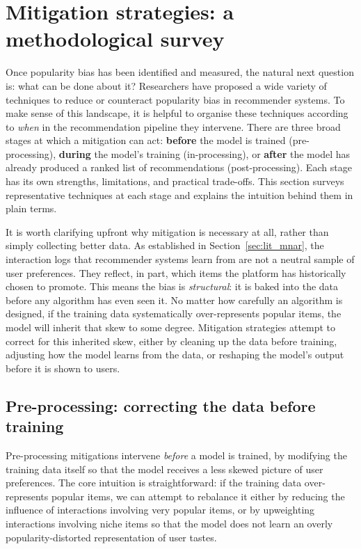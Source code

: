 \documentclass[11pt,a4paper]{report}
\begin{document}
\section{Mitigation strategies: a methodological survey}
\label{sec:lit_mitigation}

Once popularity bias has been identified and measured, the natural next question is: what can be done about it? Researchers have proposed a wide variety of techniques to reduce or counteract popularity bias in recommender systems. To make sense of this landscape, it is helpful to organise these techniques according to \emph{when} in the recommendation pipeline they intervene. There are three broad stages at which a mitigation can act: \textbf{before} the model is trained (pre-processing), \textbf{during} the model's training (in-processing), or \textbf{after} the model has already produced a ranked list of recommendations (post-processing). Each stage has its own strengths, limitations, and practical trade-offs. This section surveys representative techniques at each stage and explains the intuition behind them in plain terms.

It is worth clarifying upfront why mitigation is necessary at all, rather than simply collecting better data. As established in Section~\ref{sec:lit_mnar}, the interaction logs that recommender systems learn from are not a neutral sample of user preferences. They reflect, in part, which items the platform has historically chosen to promote. This means the bias is \emph{structural}: it is baked into the data before any algorithm has even seen it. No matter how carefully an algorithm is designed, if the training data systematically over-represents popular items, the model will inherit that skew to some degree. Mitigation strategies attempt to correct for this inherited skew, either by cleaning up the data before training, adjusting how the model learns from the data, or reshaping the model's output before it is shown to users.

\subsection*{Pre-processing: correcting the data before training}

Pre-processing mitigations intervene \emph{before} a model is trained, by modifying the training data itself so that the model receives a less skewed picture of user preferences. The core intuition is straightforward: if the training data over-represents popular items, we can attempt to rebalance it either by reducing the influence of interactions involving very popular items, or by upweighting interactions involving niche items so that the model does not learn an overly popularity-distorted representation of user tastes.
\end{document}
